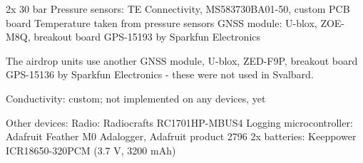 2x 30 bar Pressure sensors: TE Connectivity, MS583730BA01-50, custom PCB board
Temperature taken from pressure sensors
GNSS module: U-blox, ZOE-M8Q, breakout board GPS-15193 by Sparkfun Electronics

The airdrop units use another GNSS module, U-blox, ZED-F9P, breakout board GPS-15136 by Sparkfun Electronics - these were not used in Svalbard.

Conductivity: custom; not implemented on any devices, yet

Other devices:
Radio: Radiocrafts RC1701HP-MBUS4
Logging microcontroller: Adafruit Feather M0 Adalogger, Adafruit product 2796
2x batteries: Keeppower ICR18650-320PCM (3.7 V, 3200 mAh)
